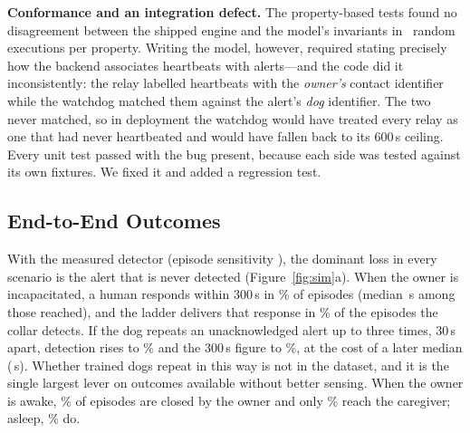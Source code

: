 \textbf{Conformance and an integration defect.} The property-based tests found no disagreement between the shipped engine and the model's invariants in ~random executions per property. Writing the model, however, required stating precisely how the backend associates heartbeats with alerts---and the code did it inconsistently: the relay labelled heartbeats with the \emph{owner's} contact identifier while the watchdog matched them against the alert's \emph{dog} identifier. The two never matched, so in deployment the watchdog would have treated every relay as one that had never heartbeated and would have fallen back to its 600\,s ceiling. Every unit test passed with the bug present, because each side was tested against its own fixtures. We fixed it and added a regression test.

\subsection{End-to-End Outcomes}
\label{sec:sim-results}
With the measured detector (episode sensitivity ), the dominant loss in every scenario is the alert that is never detected (Figure~\ref{fig:sim}a). When the owner is incapacitated, a human responds within 300\,s in \% of episodes (median \,s among those reached), and the ladder delivers that response in \% of the episodes the collar detects. If the dog repeats an unacknowledged alert up to three times, 30\,s apart, detection rises to \% and the 300\,s figure to \%, at the cost of a later median (\,s). Whether trained dogs repeat in this way is not in the dataset, and it is the single largest lever on outcomes available without better sensing. When the owner is awake, \% of episodes are closed by the owner and only \% reach the caregiver; asleep, \% do.


